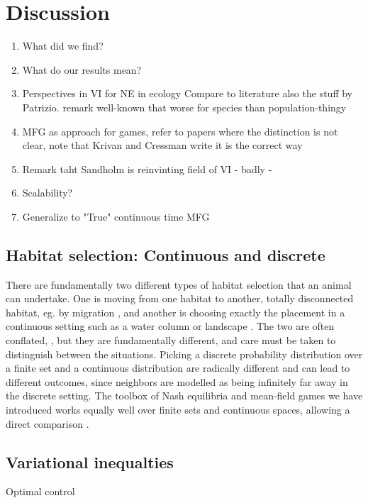 \section*{Discussion}

\begin{enumerate}
  \item What did we find?
  \item What do our results mean?
  \item Perspectives in VI for NE in ecology  Compare to literature also the stuff by Patrizio. remark well-known that worse for species than population-thingy
  \item MFG as approach for games, refer to papers where the distinction is not clear, note that Krivan and Cressman write it is the correct way
  \item Remark taht Sandholm is reinvinting field of VI - badly -
  \item Scalability?
  \item Generalize to "True" continuous time MFG
\end{enumerate}
\subsection*{Habitat selection: Continuous and discrete}
There are fundamentally two different types of habitat selection that an animal can undertake. One is moving from one habitat to another, totally disconnected habitat, eg. by migration \citep{}, and another is choosing exactly the placement in a continuous setting such as a water column or landscape \citep{}. The two are often conflated, \citep{patriziopaper, jerome}, but they are fundamentally different, and care must be taken to distinguish between the situations. Picking a discrete probability distribution over a finite set and a continuous distribution are radically different and can lead to different outcomes, since neighbors are modelled as being infinitely far away in the discrete setting. The toolbox of Nash equilibria and mean-field games we have introduced works equally well over finite sets and continuous spaces, allowing a direct comparison \citep{}.
\subsection{Variational inequalties}
Optimal control
